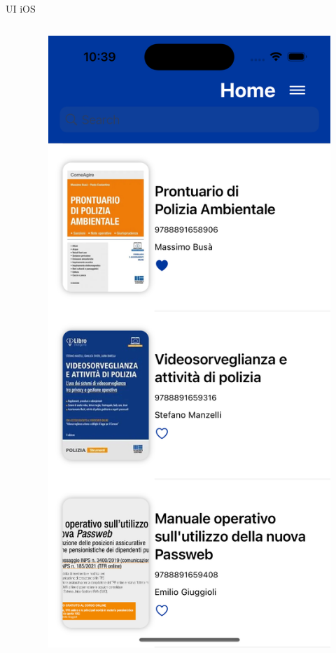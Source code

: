 \begin{frame}{UI iOS}
\begin{columns}[onlytextwidth]
\begin{column}{0.24\textwidth}
        \end{column}
        \begin{column}{0.24\textwidth}
        
             \begin{figure}[H]
                \includegraphics[width=1\textwidth]{img/home_ios.png}
            \end{figure}
            

\end{column}
\end{columns}
\end{frame}
